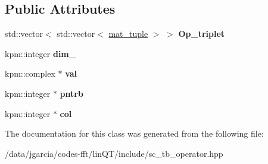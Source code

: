 \subsection*{Public Attributes}
\begin{DoxyCompactItemize}
\item 
std\+::vector$<$ std\+::vector$<$ \hyperlink{structmat__tuple}{mat\+\_\+tuple} $>$ $>$ {\bfseries Op\+\_\+triplet}\hypertarget{classSCTBOp_ac8b5d1af50925c15ce1ebbd05f334d62}{}\label{classSCTBOp_ac8b5d1af50925c15ce1ebbd05f334d62}

\item 
kpm\+::integer {\bfseries dim\+\_\+}\hypertarget{classSCTBOp_a062fcbaeedeac6c18e45c18bcf2fb47c}{}\label{classSCTBOp_a062fcbaeedeac6c18e45c18bcf2fb47c}

\item 
kpm\+::complex $\ast$ {\bfseries val}\hypertarget{classSCTBOp_aab0f9ed14d1079576dab658d8fb2476c}{}\label{classSCTBOp_aab0f9ed14d1079576dab658d8fb2476c}

\item 
kpm\+::integer $\ast$ {\bfseries pntrb}\hypertarget{classSCTBOp_aaba20a95924bd468ca759bdff722d705}{}\label{classSCTBOp_aaba20a95924bd468ca759bdff722d705}

\item 
kpm\+::integer $\ast$ {\bfseries col}\hypertarget{classSCTBOp_a15428ef8d574b4f9f354ad20e43d0f04}{}\label{classSCTBOp_a15428ef8d574b4f9f354ad20e43d0f04}

\end{DoxyCompactItemize}


The documentation for this class was generated from the following file\+:\begin{DoxyCompactItemize}
\item 
/data/jgarcia/codes-\/fft/lin\+Q\+T/include/sc\+\_\+tb\+\_\+operator.\+hpp\end{DoxyCompactItemize}
